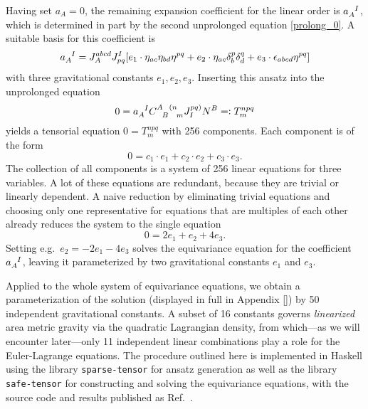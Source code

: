 \begin{example}
  Having set $a_A = 0$, the remaining expansion coefficient for the linear order is $a_A^{\hphantom AI}$, which is determined in part by the second unprolonged equation \eqref{prolong_0}. A suitable basis for this coefficient is
  \begin{equation}
    a_A^{\hphantom AI} = J_A^{abcd} J_{pq}^I\lbrack e_1 \cdot \eta_{ac} \eta_{bd} \eta^{pq} + e_2 \cdot \eta_{ac} \delta_b^p \delta_d^q + e_3 \cdot \epsilon_{abcd} \eta^{pq} \rbrack
  \end{equation}
  with three gravitational constants $e_1,e_2,e_3$. Inserting this ansatz into the unprolonged equation
  \begin{equation}
    0 = a_A^{\hphantom AI} \gmc{A}{B}{(n}{m} J^{pq)}_I N^B =\vcentcolon T^{npq}_m
  \end{equation}
  yields a tensorial equation $0 = T^{npq}_m$ with 256 components. Each component is of the form
  \begin{equation}
    0 = c_1\cdot e_1  + c_2\cdot e_2 + c_3\cdot e_3.
  \end{equation}
  The collection of all components is a system of 256 linear equations for three variables. A lot of these equations are redundant, because they are trivial or linearly dependent. A naive reduction by eliminating trivial equations and choosing only one representative for equations that are multiples of each other already reduces the system to the single equation
  \begin{equation}
    0 = 2 e_1 + e_2 + 4 e_3.
  \end{equation}
  Setting e.g.~$e_2 = -2 e_1 -4 e_3$ solves the equivariance equation for the coefficient $a_A^{\hphantom AI}$, leaving it parameterized by two gravitational constants $e_1$ and $e_3$.
\end{example}

Applied to the whole system of equivariance equations, we obtain a parameterization of the solution (displayed in full in Appendix \ref{}) by 50 independent gravitational constants. A subset of 16 constants governs \emph{linearized} area metric gravity via the quadratic Lagrangian density, from which---as we will encounter later---only 11 independent linear combinations play a role for the Euler-Lagrange equations. The procedure outlined here is implemented in Haskell using the library \texttt{sparse-tensor} for ansatz generation as well as the library \texttt{safe-tensor} for constructing and solving the equivariance equations, with the source code and results published as Ref.~\cite{Alex_2020_area-metric-gravity}.

